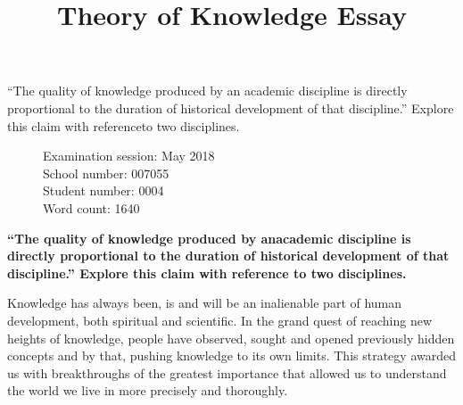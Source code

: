 \documentclass[12pt,a4paper]{article}
\title{Theory of Knowledge Essay}
\author{}
\date{}
\begin{document}

\maketitle

\doublespacing

\begin{center}

  ``The quality of knowledge produced by an academic discipline is directly proportional to the duration of historical development of that discipline.'' Explore this claim with referenceto two disciplines.

\end{center}

\begin{figure}[b]
  \begin{flushleft}
    Examination session: May 2018\\
    School number: 007055\\
    Student number: 0004\\
    Word count: 1640\\
    \end{flushleft}
  \end{figure}

\newpage
{}
\begin{center}
    \textbf{``The quality of knowledge produced by anacademic discipline is directly proportional to the duration of historical development of that discipline.'' Explore this claim with reference to two disciplines.}
\end{center}

Knowledge has always been, is and will be an inalienable part of human development, both spiritual and scientific. In the grand quest of reaching new heights of knowledge, people have observed, sought and opened previously hidden concepts and by that, pushing knowledge to its own limits. This strategy awarded us with breakthroughs of the greatest importance that allowed us to understand the world we live in more precisely and thoroughly. \\
\end{document}
